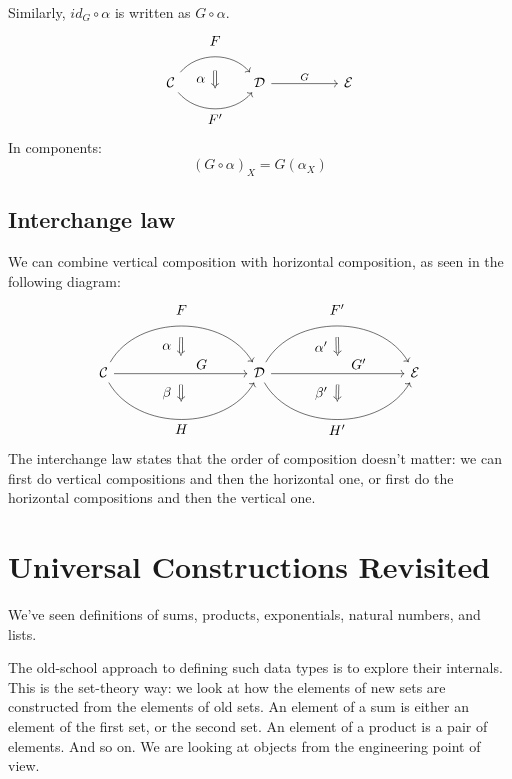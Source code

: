\documentclass[DaoFP]{subfiles}
\begin{document}
Similarly, $id_G \circ \alpha$ is written as $G \circ \alpha$.
\[
\begin{tikzcd}[column sep=huge]
\mathcal{C}
  \arrow[bend left=50]{r}[name=U, label=above:$F$]{}
  \arrow[bend right=50]{r}[name=D, label=below:$F'$]{} 
 &
\mathcal{D}
\arrow[r, "G"]
&
\mathcal{E}
  \arrow[shorten <=10pt,shorten >=10pt,Rightarrow,to path={(U) -- node[label=left:$\alpha$] {} (D)}]{}
\end{tikzcd}
\]
In components:
\[(G \circ \alpha)_X = G (\alpha_X) \]

\subsection{Interchange law}
We can combine vertical composition with horizontal composition, as seen in the following diagram:
\[
\begin{tikzcd}[column sep=huge]
\mathcal{C}
  \arrow[bend left=60]{rr}[name=U, label=above:$F$]{}
  \arrow[]{rr}[name=M, label={[xshift=15pt, yshift=-5pt]:$G$}]{} 
  \arrow[bend right=60]{rr}[name=D, label=below:$H$]{} 
 &&
\mathcal{D}
  \arrow[bend left=60]{rr}[name=U1, label=above:$F'$]{}
  \arrow[]{rr}[name=M1, label={[xshift=15pt, yshift=-5pt]:$G'$}]{} 
  \arrow[bend right=60]{rr}[name=D1, label=below:$H'$]{} 
&&
\mathcal{E}
  \arrow[shorten <=8pt, shorten >=8pt,Rightarrow, to path={(U) -- node[label=left:$\alpha$] {} (M)}]{}
  \arrow[shorten <=8pt, shorten >=8pt,Rightarrow, to path={(M) -- node[label=left:$\beta$] {} (D)}]{}
  \arrow[shorten <=8pt, shorten >=8pt,Rightarrow, to path={(U1) -- node[label=left:$\alpha'$] {} (M1)}]{}
  \arrow[shorten <=8pt, shorten >=8pt,Rightarrow, to path={(M1) -- node[label=left:$\beta'$] {} (D1)}]{}
\end{tikzcd}
\]
The interchange law states that the order of composition doesn't matter: we can first do vertical compositions and then the horizontal one, or first do the horizontal compositions and then the vertical one.

\section{Universal Constructions Revisited}

We've seen definitions of sums, products, exponentials, natural numbers, and lists. 

The old-school approach to defining such data types is to explore their internals. This is the set-theory way: we look at how the elements of new sets are constructed from the elements of old sets. An element of a sum is either an element of the first set, or the second set. An element of a product is a pair of elements. And so on. We are looking at objects from the engineering point of view.
\end{document}
